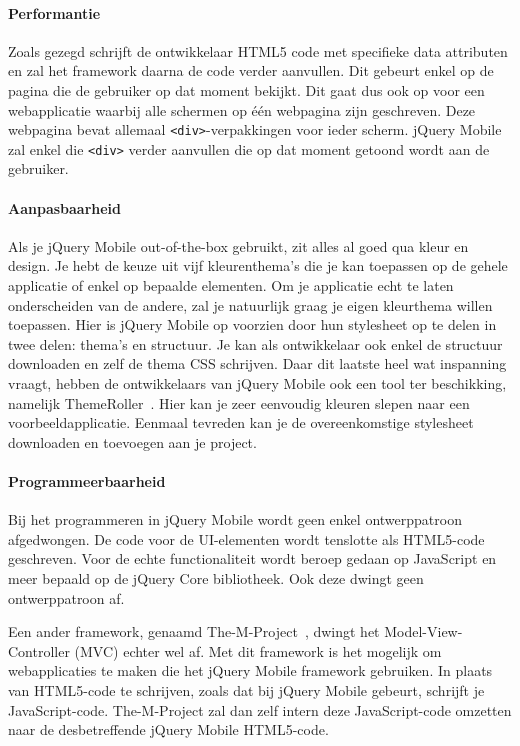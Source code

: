 \paragraph{Performantie}
Zoals gezegd schrijft de ontwikkelaar HTML5 code met specifieke data attributen en zal het framework daarna de code verder aanvullen. Dit gebeurt enkel op de pagina die de gebruiker op dat moment bekijkt. Dit gaat dus ook op voor een webapplicatie waarbij alle schermen op één webpagina zijn geschreven. Deze webpagina bevat allemaal \texttt{<div>}-verpakkingen voor ieder scherm. jQuery Mobile zal enkel die \texttt{<div>} verder aanvullen die op dat moment getoond wordt aan de gebruiker. 

\paragraph{Aanpasbaarheid}
Als je jQuery Mobile out-of-the-box gebruikt, zit alles al goed qua kleur en design. Je hebt de keuze uit vijf kleurenthema's die je kan toepassen op de gehele applicatie of enkel op bepaalde elementen. Om je applicatie echt te laten onderscheiden van de andere, zal je natuurlijk graag je eigen kleurthema willen toepassen. Hier is jQuery Mobile op voorzien door hun stylesheet op te delen in twee delen: thema's en structuur. Je kan als ontwikkelaar ook enkel de structuur downloaden en zelf de thema CSS schrijven. Daar dit laatste heel wat inspanning vraagt, hebben de ontwikkelaars van jQuery Mobile ook een tool ter beschikking,  namelijk ThemeRoller~\cite{JQuery2012c}. Hier kan je zeer eenvoudig kleuren slepen naar een voorbeeldapplicatie. Eenmaal tevreden kan je de overeenkomstige stylesheet downloaden en toevoegen aan je project.

\paragraph{Programmeerbaarheid}
Bij het programmeren in jQuery Mobile wordt geen enkel ontwerppatroon afgedwongen. De code voor de UI-elementen wordt tenslotte als HTML5-code geschreven. Voor de echte functionaliteit wordt beroep gedaan op JavaScript en meer bepaald op de jQuery Core bibliotheek. Ook deze dwingt geen ontwerppatroon af.

Een ander framework, genaamd The-M-Project~\cite{Panacoda2012}, dwingt het Model-View-Controller (MVC) echter wel af. Met dit framework is het mogelijk om webapplicaties te maken die het jQuery Mobile framework gebruiken. In plaats van HTML5-code te schrijven, zoals dat bij jQuery Mobile gebeurt, schrijft je JavaScript-code. The-M-Project zal dan zelf intern deze JavaScript-code omzetten naar de desbetreffende jQuery Mobile HTML5-code.

